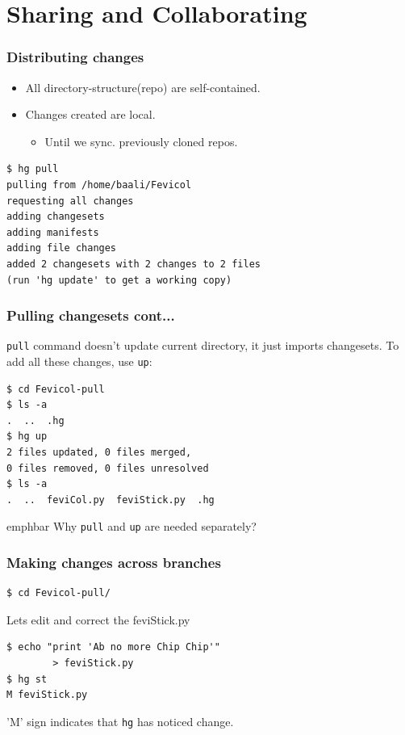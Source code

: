\documentclass[14pt,compress]{beamer}
\newcommand{\emphbar}[1]
{\begin{beamercolorbox}[rounded=true]{emphbar} 
      {#1}
 \end{beamercolorbox}
}
\newcommand{\typ}[1]{\lstinline{#1}}
\begin{document}
\section{Sharing and Collaborating}

\begin{frame}[fragile]
  \frametitle{Distributing changes}
  \begin{itemize}
  \item All directory-structure(repo) are self-contained.
  \item Changes created are local.
    \begin{itemize}
    \item Until we sync. previously cloned repos.
    \end{itemize}
  \end{itemize}
  \begin{lstlisting}
$ hg pull 
pulling from /home/baali/Fevicol
requesting all changes
adding changesets
adding manifests
adding file changes
added 2 changesets with 2 changes to 2 files
(run 'hg update' to get a working copy)
  \end{lstlisting} %
\end{frame}

\begin{frame}[fragile]
  \frametitle{Pulling changesets cont...}
  \typ{pull} command doesn't update current directory, it just imports changesets. To add all these changes, use \typ{up}:
  \begin{lstlisting}
$ cd Fevicol-pull
$ ls -a
.  ..  .hg
$ hg up
2 files updated, 0 files merged, 
0 files removed, 0 files unresolved
$ ls -a
.  ..  feviCol.py  feviStick.py  .hg    
  \end{lstlisting}
  \pause
  \emphbar{Why \typ{pull} and \typ{up} are needed separately?}
\end{frame}

\begin{frame}[fragile]
  \frametitle{Making changes across branches}
  \begin{lstlisting}
$ cd Fevicol-pull/
  \end{lstlisting} %
  Lets edit and correct the feviStick.py 
\begin{lstlisting}
$ echo "print 'Ab no more Chip Chip'" 
        > feviStick.py
$ hg st
M feviStick.py
\end{lstlisting}
  'M' sign indicates that \typ{hg} has noticed change.\\
\end{frame}
\end{document}
